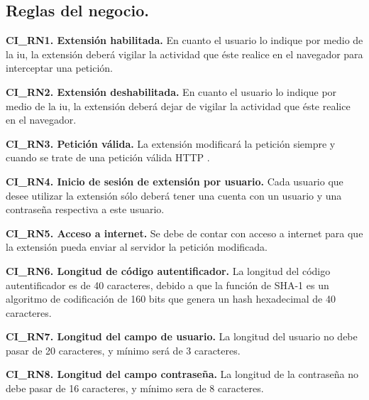 \documentclass[12pt, a4paper, titlepage]{report}
\begin{document}
		    \subsection{Reglas del negocio.}
		    
		    \textbf{CI\_RN1. Extensión habilitada.} En cuanto el usuario lo indique por medio de la \acrlong{iu}, la extensión deberá vigilar la actividad que éste realice en el navegador para interceptar una petición.\\
			\label{CI_RN1}
			
			\textbf{CI\_RN2. Extensión deshabilitada.} En cuanto el usuario lo indique por medio de la \acrlong{iu}, la extensión deberá dejar de vigilar la actividad que éste realice en el navegador.\\
			\label{CI_RN2}
			
            \textbf{CI\_RN3. Petición válida.} La extensión modificará la petición siempre y cuando se trate de una petición válida HTTP .\\
            \label{CI_RN3}
            
            \textbf{CI\_RN4. Inicio de sesión de extensión por usuario.} Cada usuario que desee utilizar la extensión sólo deberá tener una cuenta con un usuario y una contraseña respectiva a este usuario. \\
            \label{CI_RN4}
            
            \textbf{CI\_RN5. Acceso a internet.} Se debe de contar con acceso a internet para que la extensión pueda enviar al servidor la petición modificada.\\
            \label{CI_RN5}
				
			\textbf{CI\_RN6. Longitud de código autentificador.} La longitud del código autentificador es de 40 caracteres, debido a que la función de SHA-1 es un algoritmo de codificación de 160 bits que genera un hash hexadecimal de 40 caracteres.\\
			\label{CI_RN6}
			
			\textbf{CI\_RN7. Longitud del campo de usuario.} La longitud del usuario no debe pasar de 20 caracteres, y mínimo será de 3 caracteres.\\
			\label{CI_RN7}
			
			\textbf{CI\_RN8. Longitud del campo contraseña.}
			La longitud de la contraseña no debe pasar de 16 caracteres, y mínimo sera de 8 caracteres.\\
			\label{CI_RN8}
			
\end{document}
